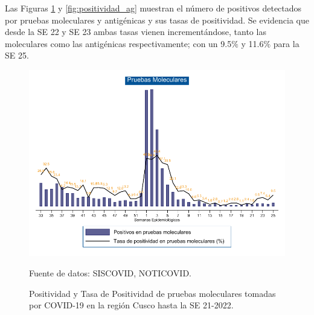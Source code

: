 \documentclass[12pt,a4paper,openany]{book}
\begin{document}
	
	
	Las Figuras \ref{fig:positividad_pcr} y \ref{fig:positividad_ag} muestran el número de positivos detectados por pruebas moleculares y antigénicas y sus tasas de positividad. Se evidencia que desde la SE 22 y SE 23 ambas tasas vienen incrementándose, tanto las moleculares como las antigénicas respectivamente; con un 9.5$\%$ y 11.6$\%$ para la SE 25.
	
	
	\begin{landscape}
		\begin{figure}[h]
			\caption{Positividad y Tasa de Positividad de pruebas moleculares tomadas por COVID-19 en la región Cusco hasta la SE 21-2022.}\label{fig:positividad_pcr}
			\begin{center}
				\includegraphics[width=0.90\linewidth]{../figuras/positividad_pcr.pdf}
			\end{center}
			{\footnotesize {Fuente de datos: SISCOVID, NOTICOVID.}}
		\end{figure}
	\end{landscape}
	\clearpage
\end{document}
